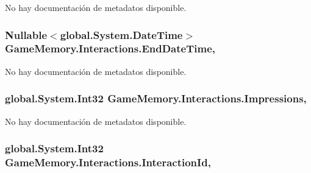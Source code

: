 No hay documentación de metadatos disponible. 

\hypertarget{class_game_memory_1_1_interactions_a7000d4b58dbf09624957b3868e754dd3}{
\subsubsection[{End\-Date\-Time}]{\setlength{\rightskip}{0pt plus 5cm}Nullable$<$global.\-System.\-Date\-Time$>$ Game\-Memory.\-Interactions.\-End\-Date\-Time\hspace{0.3cm}{\ttfamily [get]}, {\ttfamily [set]}}}\label{class_game_memory_1_1_interactions_a7000d4b58dbf09624957b3868e754dd3}


No hay documentación de metadatos disponible. 

\hypertarget{class_game_memory_1_1_interactions_a34268d69790879d63853fb1ab5b72f21}{
\subsubsection[{Impressions}]{\setlength{\rightskip}{0pt plus 5cm}global.\-System.\-Int32 Game\-Memory.\-Interactions.\-Impressions\hspace{0.3cm}{\ttfamily [get]}, {\ttfamily [set]}}}\label{class_game_memory_1_1_interactions_a34268d69790879d63853fb1ab5b72f21}


No hay documentación de metadatos disponible. 

\hypertarget{class_game_memory_1_1_interactions_a1f644eb88ea4634d1760257a2017016a}{
\subsubsection[{Interaction\-Id}]{\setlength{\rightskip}{0pt plus 5cm}global.\-System.\-Int32 Game\-Memory.\-Interactions.\-Interaction\-Id\hspace{0.3cm}{\ttfamily [get]}, {\ttfamily [set]}}}\label{class_game_memory_1_1_interactions_a1f644eb88ea4634d1760257a2017016a}


